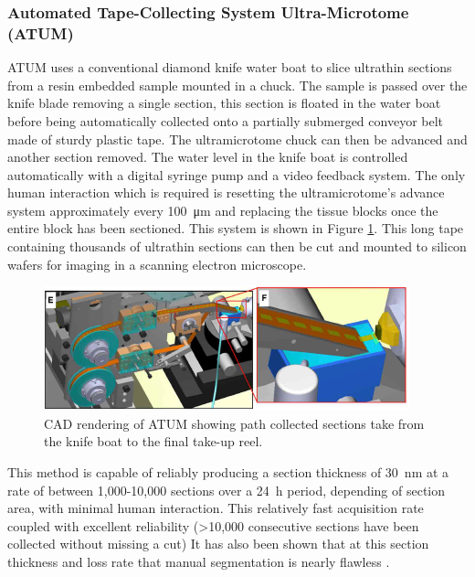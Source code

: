 \documentclass[a4paper, 11pt]{article}
\numberwithin{equation}{section}
\begin{document}
	\subsubsection{Automated Tape-Collecting System Ultra-Microtome (ATUM)}
	\label{sectioning_smaller_ATUM}
	
	ATUM uses a conventional diamond knife water boat to slice ultrathin sections from a resin embedded sample mounted in a chuck. The sample is passed over the knife blade removing a single section, this section is floated in the water boat before being automatically collected onto a partially submerged conveyor belt made of sturdy plastic tape. The ultramicrotome chuck can then be advanced and another section removed. The water level in the knife boat is controlled automatically with a digital syringe pump and a video feedback system. The only human interaction which is required is resetting the ultramicrotome's advance system approximately every \SI{100}{\micro\meter} and replacing the tissue blocks once the entire block has been sectioned\cite{hayworth2014atum}\cite{schalek2011atum}. This system is shown in Figure \ref{ATUM}. This long tape containing thousands of ultrathin sections can then be cut and mounted to silicon wafers for imaging in a scanning electron microscope.
	
	\begin{figure}[h]
		\centering
		\includegraphics[width=\textwidth]{ATUM}
		\caption{CAD rendering of ATUM showing path collected sections take from the knife boat to the final take-up reel.\cite{hayworth2014atum}}
		\label{ATUM}
	\end{figure}
	
	This method is capable of reliably producing a section thickness of \SI{30}{\nano\meter} at a rate of between 1,000-10,000 sections over a \SI{24}{\hour} period, depending of section area, with minimal human interaction\cite{hayworth2014atum}. This relatively fast acquisition rate coupled with excellent reliability (>10,000 consecutive sections have been collected without missing a cut) It has also been shown that at this section thickness and loss rate that manual segmentation is nearly flawless \cite{kasthuri2015saturated}.
	
\end{document}
